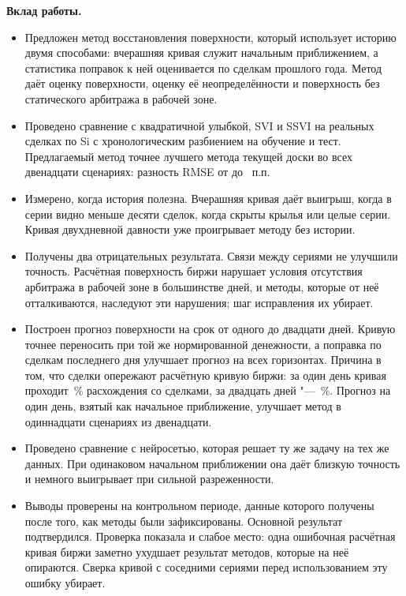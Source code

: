 \documentclass{article}
\begin{document}
\textbf{Вклад работы.}
\begin{itemize}
    \item Предложен метод восстановления поверхности, который использует историю двумя способами: вчерашняя кривая служит начальным приближением, а статистика поправок к ней оценивается по сделкам прошлого года. Метод даёт оценку поверхности, оценку её неопределённости и поверхность без статического арбитража в рабочей зоне.
    \item Проведено сравнение с квадратичной улыбкой, SVI и SSVI на реальных сделках по Si с хронологическим разбиением на обучение и тест. Предлагаемый метод точнее лучшего метода текущей доски во всех двенадцати сценариях: разность RMSE от  до ~п.п.
    \item Измерено, когда история полезна. Вчерашняя кривая даёт выигрыш, когда в серии видно меньше десяти сделок, когда скрыты крылья или целые серии. Кривая двухдневной давности уже проигрывает методу без истории.
    \item Получены два отрицательных результата. Связи между сериями не улучшили точность. Расчётная поверхность биржи нарушает условия отсутствия арбитража в рабочей зоне в большинстве дней, и методы, которые от неё отталкиваются, наследуют эти нарушения; шаг исправления их убирает.
    \item Построен прогноз поверхности на срок от одного до двадцати дней. Кривую точнее переносить при той же нормированной денежности, а поправка по сделкам последнего дня улучшает прогноз на всех горизонтах. Причина в том, что сделки опережают расчётную кривую биржи: за один день кривая проходит \,\% расхождения со сделками, за двадцать дней "--- \,\%. Прогноз на один день, взятый как начальное приближение, улучшает метод в одиннадцати сценариях из двенадцати.
    \item Проведено сравнение с нейросетью, которая решает ту же задачу на тех же данных. При одинаковом начальном приближении она даёт близкую точность и немного выигрывает при сильной разреженности.
    \item Выводы проверены на контрольном периоде, данные которого получены после того, как методы были зафиксированы. Основной результат подтвердился. Проверка показала и слабое место: одна ошибочная расчётная кривая биржи заметно ухудшает результат методов, которые на неё опираются. Сверка кривой с соседними сериями перед использованием эту ошибку убирает.
\end{itemize}
\end{document}

